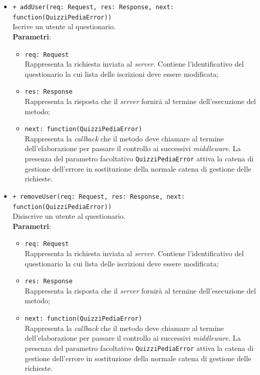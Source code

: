 \begin{itemize}
\begin{itemize}
		\item \texttt{+ addUser(req: Request, res: Response, next: function(QuizziPediaError))}\\
		Iscrive un utente al questionario.\\
		\textbf{Parametri}:
		\begin{itemize}
			\item \texttt{req: Request}\\
			Rappresenta la richiesta inviata al \textit{server}. Contiene l'identificativo del questionario la cui lista delle iscrizioni deve essere modificata;
			\item \texttt{res: Response}\\
			Rappresenta la risposta che il \textit{server} fornirà al termine dell'esecuzione del metodo;
			\item \texttt{next: function(QuizziPediaError)}\\
			Rappresenta la \textit{callback} che il metodo deve chiamare al termine dell'elaborazione per passare il controllo ai successivi \textit{middleware}. La presenza del parametro facoltativo \texttt{QuizziPediaError} attiva la catena di gestione dell'errore in sostituzione della normale catena di gestione delle richieste.
		\end{itemize}
		\item \texttt{+ removeUser(req: Request, res: Response, next: function(QuizziPediaError))}\\
		Disiscrive un utente al questionario.\\
		\textbf{Parametri}:
		\begin{itemize}
			\item \texttt{req: Request}\\
			Rappresenta la richiesta inviata al \textit{server}. Contiene l'identificativo del questionario la cui lista delle iscrizioni deve essere modificata;
			\item \texttt{res: Response}\\
			Rappresenta la risposta che il \textit{server} fornirà al termine dell'esecuzione del metodo;
			\item \texttt{next: function(QuizziPediaError)}\\
			Rappresenta la \textit{callback} che il metodo deve chiamare al termine dell'elaborazione per passare il controllo ai successivi \textit{middleware}. La presenza del parametro facoltativo \texttt{QuizziPediaError} attiva la catena di gestione dell'errore in sostituzione della normale catena di gestione delle richieste.
		\end{itemize}
		

\end{itemize}
\end{itemize}
